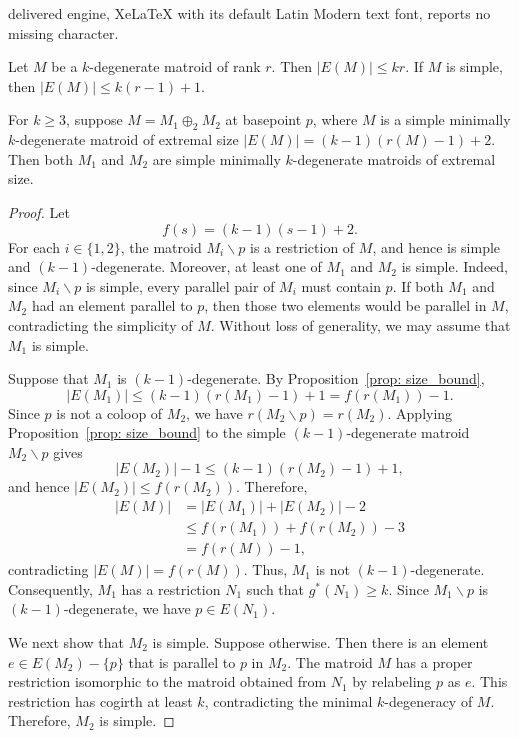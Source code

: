 \documentclass[10pt,a4paper]{amsart}
\newcommand{\ba}{\backslash}
\begin{document}
delivered engine, XeLaTeX with its default Latin Modern text font, reports no missing character.
\begin{proposition}
\label{prop: size_bound}
Let $M$ be a $k$-degenerate matroid of rank $r$. Then $|E(M)|\leq kr$. If $M$ is simple, then $|E(M)| \leq k(r-1)+1$. 
\end{proposition}

\begin{lemma}
\label{lem: 2-sum_components_extremal}
For $k \ge 3$, suppose $M = M_1 \oplus_2 M_2$ at basepoint $p$, where $M$ is a simple minimally $k$-degenerate matroid of extremal size $|E(M)| = (k-1)(r(M)-1)+2$. Then both $M_1$ and $M_2$ are simple minimally $k$-degenerate matroids of extremal size.
\end{lemma}

\begin{proof}
Let
\[
    f(s)=(k-1)(s-1)+2.
\]
For each $i\in\{1,2\}$, the matroid $M_i\ba p$ is a restriction of $M$, and hence is simple and $(k-1)$-degenerate. Moreover, at least one of $M_1$ and $M_2$ is simple. Indeed, since $M_i\ba p$ is simple, every parallel pair of $M_i$ must contain $p$. If both $M_1$ and $M_2$ had an element parallel to $p$, then those two elements would be parallel in $M$, contradicting the simplicity of $M$. Without loss of generality, we may assume that $M_1$ is simple.

Suppose that $M_1$ is $(k-1)$-degenerate. By Proposition~\ref{prop: size_bound},
\[
    |E(M_1)|\leq (k-1)(r(M_1)-1)+1=f(r(M_1))-1.
\]
Since $p$ is not a coloop of $M_2$, we have $r(M_2\ba p)=r(M_2)$. Applying Proposition~\ref{prop: size_bound} to the simple $(k-1)$-degenerate matroid $M_2\ba p$ gives
\[
    |E(M_2)|-1\leq (k-1)(r(M_2)-1)+1,
\]
and hence $|E(M_2)|\leq f(r(M_2))$. Therefore,
\begin{align*}
    |E(M)|
    &=|E(M_1)|+|E(M_2)|-2\\
    &\leq f(r(M_1))+f(r(M_2))-3\\
    &=f(r(M))-1,
\end{align*}
contradicting $|E(M)|=f(r(M))$. Thus, $M_1$ is not $(k-1)$-degenerate. Consequently, $M_1$ has a restriction $N_1$ such that $g^*(N_1)\geq k$. Since $M_1\ba p$ is $(k-1)$-degenerate, we have $p\in E(N_1)$.

We next show that $M_2$ is simple. Suppose otherwise. Then there is an element $e\in E(M_2)-\{p\}$ that is parallel to $p$ in $M_2$. The matroid $M$ has a proper restriction isomorphic to the matroid obtained from $N_1$ by relabeling $p$ as $e$. This restriction has cogirth at least $k$, contradicting the minimal $k$-degeneracy of $M$. Therefore, $M_2$ is simple.


\end{proof}
\end{document}
